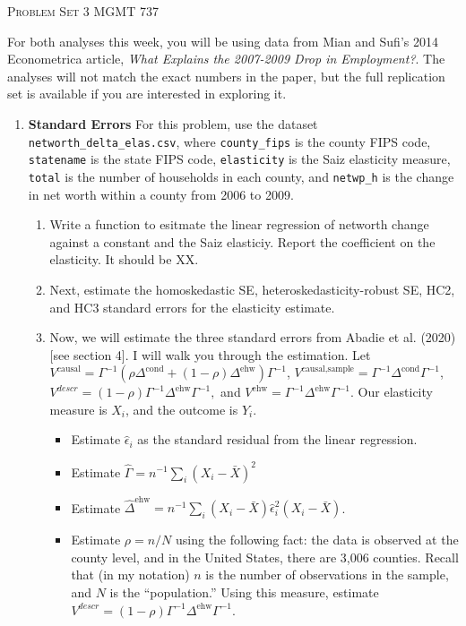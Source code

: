 \documentclass[11pt, a4paper]{article}
\begin{document}
\begin{center}
  {\Large \textsc{Problem Set 3}}
  MGMT 737
\end{center}

For both analyses this week, you will be using data from Mian and
Sufi's 2014 Econometrica article, \textit{What Explains the 2007-2009
  Drop in Employment?}. The analyses will not match the exact
numbers in the paper, but the full replication set is available if you are interested in exploring it.

\begin{enumerate}
\item \textbf{Standard Errors} For this problem, use the dataset \texttt{networth\_delta\_elas.csv}, where \texttt{county\_fips} is the county FIPS code, \texttt{statename} is the state FIPS code, \texttt{elasticity} is the Saiz elasticity measure, \texttt{total} is the number of households in each county, and \texttt{netwp\_h} is the change in net worth within a county from 2006 to 2009.
  \begin{enumerate}
  \item Write a function to esitmate the linear regression of networth change against a constant and the Saiz elasticiy. Report the coefficient on the elasticity. It should be XX.
  \item Next, estimate the homoskedastic SE, heteroskedasticity-robust SE, HC2, and HC3 standard errors for the elasticity estimate.
  \item Now, we will estimate the three standard errors from Abadie et al. (2020) [see section 4]. I will walk you through the estimation. Let $V^{\text{causal}} = \Gamma^{-1}(\rho\Delta^{\text{cond}} + (1-\rho)\Delta^{\text{ehw}})\Gamma^{-1}$, $V^{\text{causal,sample}} = \Gamma^{-1}\Delta^{\text{cond}}\Gamma^{-1}$, $V^{descr} = (1-\rho)\Gamma^{-1}\Delta^{\text{ehw}}\Gamma^{-1},$ and $V^{\text{ehw}} = \Gamma^{-1}\Delta^{\text{ehw}}\Gamma^{-1}.$ Our elasticity measure is $X_{i}$, and the outcome is $Y_{i}$.
    \begin{itemize}
    \item Estimate $\hat{\epsilon}_{i}$ as the standard residual from
      the linear regression.
    \item Estimate $\hat{\Gamma} = n^{-1}\sum_{i}(X_{i} - \bar{X})^{2}$
    \item Estimate $\hat{\Delta}^{\text{ehw}} = n^{-1}\sum_{i}(X_{i} - \bar{X})\hat{\epsilon}^{2}_{i}(X_{i} - \bar{X})$.
    \item Estimate $\rho = n/N$ using the following fact: the data is observed at the county level, and in the United States, there are 3,006 counties. Recall that (in my notation) $n$ is the number of observations in the sample, and $N$ is the ``population.'' Using this measure, estimate $V^{descr} = (1-\rho)\Gamma^{-1}\Delta^{\text{ehw}}\Gamma^{-1}$.

\end{itemize}
\end{enumerate}
\end{enumerate}
\end{document}
